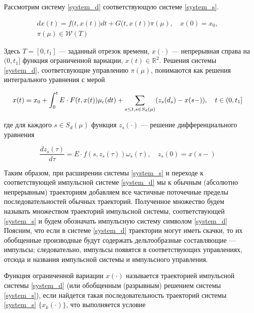 \documentclass[a4paper,12pt]{article}
\begin{document}
 Рассмотрим систему \eqref{system_d} соответствующую системе
\eqref{system_s}.

\begin{equation}
  \label{system_d}
  \begin{array}{l}
    dx(t)=f\big(t,x(t)\big)dt+G\big(t,x(t)\big)\pi(\mu), \quad
    x(0)=x_0, \\[8pt]
    \pi(\mu) \in \mathcal{W}(T)
  \end{array} 
\end{equation}

Здесь $T=[0,t_1]$ --- заданный отрезок времени, $x(\cdot)$ ---
непрерывная справа на $(0,t_1]$ функция ограниченной вариации, $x(t)
\in \mathbb{R}^2$. Решения системы \eqref{system_d}, соответсвующие
управлению $\pi(\mu)$, понимаются как решения интегрального уравнения
с мерой

\begin{equation*}
  x(t) = x_0  + \int_0^t E\cdot F(t,x(t)) \mu_c(dt) +
  \sum_{s \le t,\\s \in S_d(\mu)} (z_s(d_s) - x(s-)), \quad t \in (0,t_1]
\end{equation*}

где для каждого $s \in S_d(\mu)$ функция $z_s(\cdot)$ --- решение
дифференциального уравнения

\begin{equation*}
  \frac{dz_s(\tau)}{d\tau} = E\cdot f(s,z_s(\tau))\omega_s(\tau), 
	\quad z_s(0)=x(s-)
\end{equation*}

Таким образом, при расширении системы \eqref{system_s} и переходе к
соответствующей импульсной системе \eqref{system_d} мы к обычным
(абсолютно непрерывным) траекториям добавляем все частичные
поточечные пределы последовательностей обычных
траекторий. Полученное множество будем называть множеством
траекторий импульсной системы, соответствующей \eqref{system_s} и будем
обозначать импульсную систему символом \eqref{system_d} Поясним,
что если в системе \eqref{system_d} траектории могут иметь скачки,
то их обобщенные производные будут содержать дельтообразные
составляющие --- импульсы; следовательно, импульсы появятся в
соответствующих управлениях, отсюда и названия импульсной системы и
импульсного управления.


Функция ограниченной вариации $x(\cdot)$ называется траекторией импульсной
системы \eqref{system_d} (или обобщенным (разрывным) решением системы
\eqref{system_s}), если найдется такая последовательность траекторий системы
\eqref{system_s} $\bigl\{x_k(\cdot)\bigr\}$, что выполняется условие 
\end{document}
